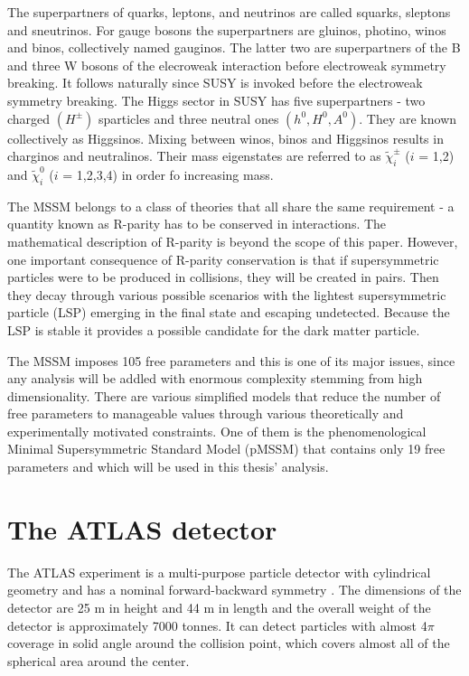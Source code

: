 The superpartners of quarks, leptons, and neutrinos are called squarks, sleptons and sneutrinos. For gauge bosons the superpartners are  gluinos, photino, winos and binos, collectively named gauginos. The latter two are superpartners of the  B and three W bosons of the elecroweak interaction before electroweak symmetry breaking. It follows naturally since SUSY is invoked before the electroweak symmetry breaking. The Higgs sector in SUSY has five superpartners  - two charged $(H^{\pm})$ sparticles and three neutral ones $(h^0, H^0, A^0)$. They are known collectively as Higgsinos. Mixing between winos, binos and Higgsinos results in charginos and neutralinos. Their mass eigenstates are referred to as $\tilde{\chi}^{\pm}_{i}$ ($i$ = 1,2) and $\tilde{\chi}^{0}_{i}$ ($i$ = 1,2,3,4) in order fo increasing mass. 

The MSSM belongs to a class of theories that all share the same requirement - a quantity known as R-parity has to be conserved in interactions. The mathematical description of R-parity is beyond the scope of this paper. However, one important consequence of R-parity conservation is that if supersymmetric particles were to be produced in collisions, they will be created in pairs. Then they decay through various possible scenarios with the lightest supersymmetric particle (LSP) emerging in the final state and escaping undetected. Because the LSP is stable it provides a possible candidate for the dark matter particle.

The MSSM imposes 105 free parameters and this is one of its major issues, since any analysis will be addled with enormous complexity stemming from high dimensionality. There are various simplified models that reduce the number of free parameters to manageable values through various theoretically and experimentally motivated constraints. One of them is the phenomenological Minimal Supersymmetric Standard Model (pMSSM) that contains only 19 free parameters and which will be used in this thesis' analysis. 





\section{The ATLAS detector}
\label{sec:atlas}
The ATLAS experiment is a multi-purpose particle detector with cylindrical geometry and has a nominal forward-backward symmetry \citep{aad2008atlas}. The dimensions of the detector are 25 m in height and 44 m in length and the overall weight of the detector is approximately 7000 tonnes.
It can detect particles with almost 4$\pi$ coverage in solid angle around the collision point, which covers almost all of the spherical area around the center. 

